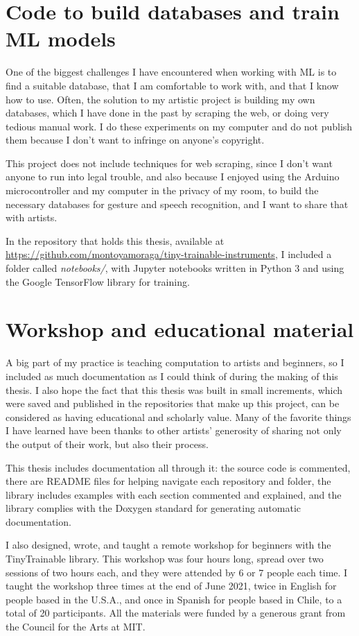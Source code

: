 \section{Code to build databases and train ML models}

One of the biggest challenges I have encountered when working with \acrshort{ML} is to find a suitable database, that I am comfortable to work with, and that I know how to use. Often, the solution to my artistic project is building my own databases, which I have done in the past by scraping the web, or doing very tedious manual work. I do these experiments on my computer and do not publish them because I don't want to infringe on anyone's copyright.

This project does not include techniques for web scraping, since I don't want anyone to run into legal trouble, and also because I enjoyed using the Arduino microcontroller and my computer in the privacy of my room, to build the necessary databases for gesture and speech recognition, and I want to share that with artists.

In the repository that holds this thesis, available at \url{https://github.com/montoyamoraga/tiny-trainable-instruments}, I included a folder called \emph{notebooks/}, with Jupyter notebooks written in Python 3 and using the Google TensorFlow library for training.

\section{Workshop and educational material}

A big part of my practice is teaching computation to artists and beginners, so I included as much documentation as I could think of during the making of this thesis. I also hope the fact that this thesis was built in small increments, which were saved and published in the repositories that make up this project, can be considered as having  educational and scholarly value. Many of the favorite things I have learned have been thanks to other artists' generosity of sharing not only the output of their work, but also their process.

This thesis includes documentation all through it: the source code is commented, there are README files for helping navigate each repository and folder, the library includes examples with each section commented and explained, and the library complies with the Doxygen standard for generating automatic documentation.

I also designed, wrote, and taught a remote workshop for beginners with the TinyTrainable library. This workshop was four hours long, spread over two sessions of two hours each, and they were attended by 6 or 7 people each time. I taught the workshop three times at the end of June 2021, twice in English for people based in the U.S.A., and once in Spanish for people based in Chile, to a total of 20 participants. All the materials were funded by a generous grant from the Council for the Arts at MIT.

